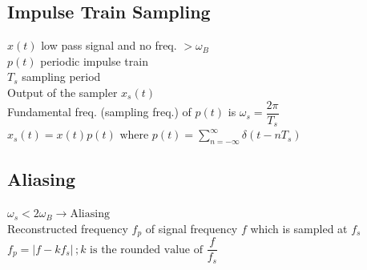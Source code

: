 \documentclass[]{article}
\begin{document}
\begin{multicols}{2}
    \subsection*{Impulse Train Sampling}
    $x(t)$ low pass signal and no freq. $> \omega_B$\\
    $p(t)$ periodic impulse train\\
    $T_s$ sampling period\\
    Output of the sampler $x_s(t)$\\
    Fundamental freq. (sampling freq.) of $p(t)$ is $\omega_s = \dfrac{2\pi}{T_s}$\\
    $x_s(t) = x(t)p(t) \text{ where } p(t) = \sum\limits_{n = -\infty}^{\infty} \delta(t - nT_s)$

    \subsection*{Aliasing}
    $\omega_s < 2\omega_B \rightarrow \text{Aliasing}$ \\
    Reconstructed frequency $f_p$ of signal frequency $f$ which is sampled at $f_s$\\
    $f_p = |f - kf_s|\, ;k \text{ is the rounded value of } \dfrac{f}{f_s}$

\end{multicols}
\end{document}

